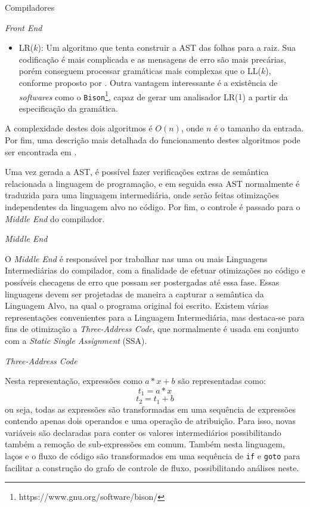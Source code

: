 \begin{section}{Compiladores}
\begin{subsection}{\textit{Front End}}
\begin{itemize}
    \item LR($k$): Um algoritmo que tenta construir a AST das folhas para a raiz.
          Sua codificação é mais complicada e as mensagens de erro são mais
          precárias, porém conseguem processar gramáticas mais complexas que
          o LL($k$), conforme proposto por \cite{knuth1965translation}. 
          Outra vantagem interessante é a existência de
          \textit{softwares} como o
          \texttt{Bison}\footnote{https://www.gnu.org/software/bison/}, capaz
          de gerar um analisador LR($1$) a partir da especificação da gramática.
\end{itemize}
	A complexidade destes dois algoritmos é $O(n)$, onde $n$ é o tamanho da entrada.
    Por fim, uma descrição mais detalhada do funcionamento destes algoritmos
pode ser encontrada em \citep{appel2004modern}.

    Uma vez gerada a AST, é possível fazer verificações extras de semântica
relacionada a linguagem de programação, e em seguida essa AST normalmente é
traduzida para uma linguagem intermediária, onde serão feitas otimizações
independentes da linguagem alvo no código. Por fim, o controle é passado
para o \textit{Middle End} do compilador.

\end{subsection}

\begin{subsection}{\textit{Middle End}}

    O \textit{Middle End} é responsável por trabalhar nas uma ou mais
 Linguagens Intermediárias do compilador, com a finalidade de efetuar
otimizações no código e possíveis checagens de erro que possam ser
postergadas até essa fase. Essas linguagens devem ser projetadas
de maneira a capturar a semântica da Linguagem Alvo, na qual o programa original foi
escrito.
Existem várias representações convenientes para a Linguagem Intermediária,
mas destaca-se para fins de otimização 
a \textit{Three-Address Code}, que normalmente é usada em conjunto com
a \textit{Static Single Assignment} (SSA).

\begin{subsubsection}{\textit{Three-Address Code}}


Nesta representação, expressões como $a*x + b$ são
representadas como:
$$ t_1 = a*x$$
\vspace*{-1cm}
$$ t_2 = t_1 + b $$
ou seja, todas as expressões são transformadas em uma sequência de expressões
contendo apenas dois operandos e uma operação de atribuição. Para isso,
novas variáveis são declaradas para conter os valores intermediários
possibilitando também a remoção de sub-expressões em comum.  Também nesta
linguagem, laços e o fluxo de código são transformados em uma sequência de
\texttt{if} e \texttt{goto} para facilitar a construção do grafo de
controle de fluxo, possibilitando análises neste.


\end{subsubsection}
\end{subsection}
\end{section}
